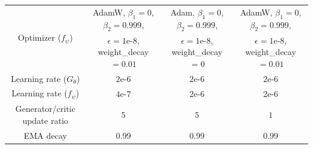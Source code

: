 \begin{table}[t]
{\begin{tabular}{cccc}
\multirow{2}{*}{Optimizer ($f_\psi$)} & AdamW, $\beta_1=0$, $\beta_2=0.999$,                                                                                & Adam, $\beta_1=0$, $\beta_2=0.999$,                                                    & AdamW, $\beta_1=0$, $\beta_2=0.999$,                                                                                \\
                                        & $\epsilon=1\text{e-8}$,  weight\_decay$=0.01$ & $\epsilon=1\text{e-8}$,  weight\_decay$=0$ & $\epsilon=1\text{e-8}$, weight\_decay$=0.01$ \\
Learning rate ($G_\theta$)              & $2\text{e-6}$                                                                        & $2\text{e-6}$                                          & $2\text{e-6}$                                                                       \\
Learning rate ($f_\psi$)                & $4\text{e-7}$                                                                        & $2\text{e-6}$                                          & $2\text{e-6}$                                                                      \\
Generator/critic update ratio                & $5$                                                                        & $5$                                          & $1$                                                                      \\
EMA decay                & $0.99$                                                                        & $0.99$                                          & $0.99$                                                                      \\
\bottomrule
\end{tabular}
}
\vspace{-1em}
\end{table}